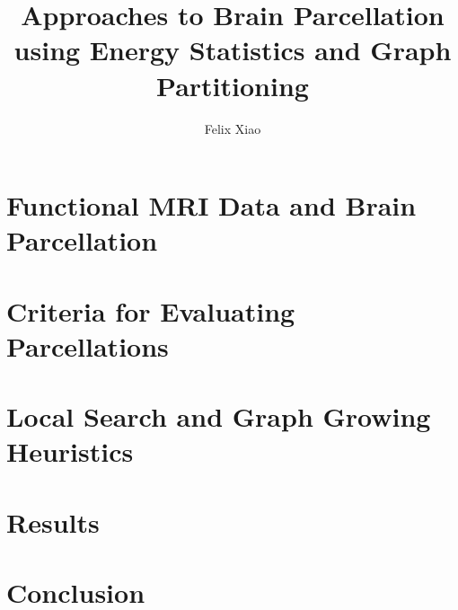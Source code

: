\documentclass[12pt,lot,lof]{puthesis_undergraduate}
\title{Approaches to Brain Parcellation using Energy Statistics and Graph Partitioning}
\author{Felix Xiao}
\begin{document}
\maketitle
\tableofcontents

\chapter{Functional MRI Data and Brain Parcellation}


%

\chapter{Criteria for Evaluating Parcellations}


\chapter{Local Search and Graph Growing Heuristics}


%

%

%

\chapter{Results}

\chapter{Conclusion}



\end{document}
